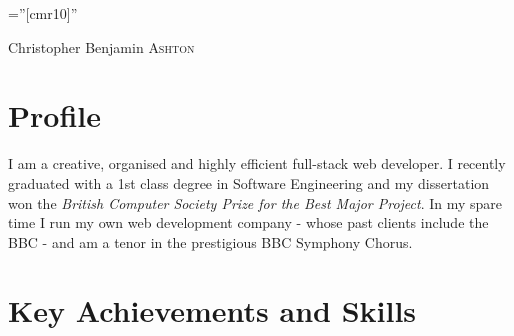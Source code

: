 \documentclass[a4paper,10pt]{article}
\begin{document}
\pagestyle{empty} %

\font\fb=''[cmr10]'' %

\par{\centering
		{\Huge Christopher Benjamin \textsc{Ashton}
	}\bigskip\par}

\begin{center}
\customcontact
\end{center}


\section{Profile}

I am a creative, organised and highly efficient full-stack web developer. I recently graduated with a 1st class degree in Software Engineering and my dissertation won the \emph{British Computer Society Prize for the Best Major Project}. In my spare time I run my own web development company - whose past clients include the BBC - and am a tenor in the prestigious BBC Symphony Chorus.

\section{Key Achievements and Skills}
\end{document}
